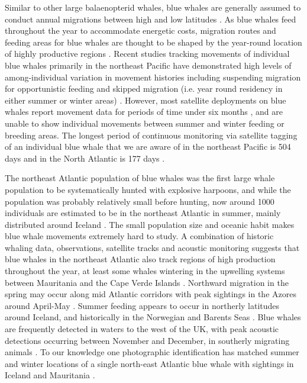 \documentclass[a4paper,12pt]{article}
\begin{document}
Similar to other large balaenopterid whales, blue whales are generally assumed to conduct annual migrations between high and low latitudes \citep{huckgaete2018}. 
As blue whales feed throughout the year to accommodate energetic costs, migration routes and feeding areas for blue whales are thought to be shaped by the year-round location of highly productive regions \citep{branch2007}. 
Recent studies tracking movements of individual blue whales primarily in the northeast Pacific have demonstrated high levels of among-individual variation in movement histories including suspending migration for opportunistic feeding and skipped migration (i.e. year round residency in either summer or winter
areas) \citep{busquets2017estimating}. 
However, most satellite deployments on blue whales report movement data for periods of time under six months \citep{heide2001new, silva2013north, bailey2009behavioural, lesage2017foraging, irvine2017quantifying}, and are unable to show individual movements between summer and winter feeding or breeding areas. 
The longest period of continuous monitoring via satellite tagging of an individual blue whale that we are aware of in the northeast Pacific is 504 days \citep{irvine2017quantifying} and in the North Atlantic is 177 days \citep{lesage2017foraging}.

The northeast Atlantic population of blue whales was the first large whale population to be systematically hunted with explosive harpoons, and while the population was probably relatively small before hunting, now around 1000 individuals are estimated to be in the northeast Atlantic in summer, mainly distributed around Iceland \citep{pike2009note}. 
The small population size and oceanic habit makes blue whale movements extremely hard to study. 
A combination of historic whaling data, observations, satellite tracks and acoustic monitoring suggests that blue whales in the northeast Atlantic also track regions of high production throughout the year, at least some whales wintering in the upwelling systems between Mauritania and the Cape Verde Islands \citep{baines2014upwellings}. 
Northward migration in the spring may occur along mid Atlantic corridors with peak sightings in the Azores around April-May \citep{silva2013north}. 
Summer feeding appears to occur in northerly latitudes around Iceland, and historically in the Norwegian and Barents Seas \citep{pike2009note}. 
Blue whales are frequently detected in waters to the west of the UK, with peak acoustic detections occurring between November and December, in southerly migrating animals \citep{reeves2004historical,baines2017autumn,charif2009acoustic,visser2011timing}.
To our knowledge one photographic identification has matched summer and winter locations of a single north-east Atlantic blue whale with sightings in Iceland and Mauritania \citep{poster}.
\end{document}
